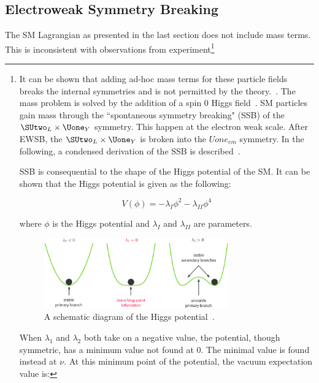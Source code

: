 \subsection{Electroweak Symmetry Breaking}
\label{sec:SSB}
The SM Lagrangian as presented in the last section does not include mass terms. This is inconsistent with observations from experiment\footnote{It can be shown that adding ad-hoc mass terms for these particle fields breaks the internal symmetries and is not permitted by the theory.~\cite{peskin2018introduction}. The mass problem is solved by the addition of a spin 0 Higgs field~\cite{higgs1964broken}. SM particles gain mass through the ``spontaneous symmetry breaking" (SSB) of the $\SUtwo_{L} \times \Uone_{Y}$ symmetry. This happen at the electron weak scale. After EWSB, the $\SUtwo_{L} \times \Uone_{Y}$ is broken into the $Uone_{em}$ symmetry. In the following, a condensed derivation of the SSB is described~\cite{peskin2018introduction}.


SSB is consequential to the shape of the Higgs potential of the SM. It can be shown that the Higgs potential is given as the following:

\begin{equation}
    V(\phi) = - \lambda_{I}\phi^{2} - \lambda_{II} \phi^{4}
    \label{eq:HiggsPotential}
\end{equation}

where $\phi$ is the Higgs potential and $\lambda_{I}$ and $\lambda_{II}$ are parameters. 

\begin{figure}[!htb]
    \begin{center}
        \includegraphics[width=0.75\textwidth]{figures/chapter_SM/SSB}
        \caption{
        A schematic diagram of the Higgs potential~\cite{Potential}.}
        \label{fig:SM}
    \end{center}
\end{figure}

When $\lambda_{1}$ and $\lambda_2$ both take on a negative value, the potential, though symmetric, has a minimum value not found at 0. The minimal value is found instead at $\nu$. At this minimum point of the potential, the vacuum expectation value is:

}
